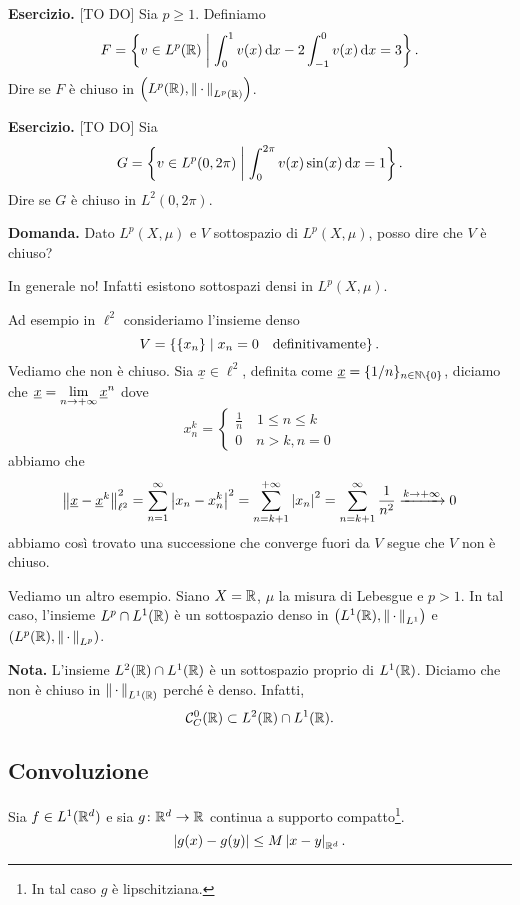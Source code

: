 \textbf{Esercizio.} [TO DO] Sia $p \geq 1$. Definiamo 
%
$$
F = \left\{ v \in L^p(\mathbb R) \;\middle|\; \int_{0}^{1} v(x) \,\mathrm{d} x - 2 \int_{-1}^{0} v(x) \,\mathrm{d} x = 3 \right\}.
$$
%
Dire se $F$ è chiuso in $\left( L^p(\mathbb R), \left\lVert \,\cdot\, \right\rVert_{L^p(\mathbb R)} \right)$.


\textbf{Esercizio.} [TO DO] Sia 
%
$$
G = \left\{ v \in L^p(0,2\pi) \;\middle|\; \int_{0}^{2\pi} v(x) \sin(x) \,\mathrm{d} x = 1  \right\}.
$$
%
Dire se $G$ è chiuso in $L^2(0,2\pi)$.

\textbf{Domanda.} Dato $L^p (X,\mu)$ e $V$ sottospazio di $L^p(X,\mu)$, posso dire che $V$ è chiuso?

In generale no! Infatti esistono sottospazi densi in $L^p(X,\mu)$.

Ad esempio in $\ell^2$ consideriamo l'insieme denso
%
$$
V = \left\{ \left\{ x_n \right\} \;\middle|\; x_n = 0 \quad \text{definitivamente}  \right\}.
$$
%
Vediamo che non è chiuso. Sia $\underline{x} \in \ell^2$, definita come $\underline{x} = \{ 1 / n \}_{n \in \N \setminus \{0 \}}$, diciamo che $\displaystyle \underline{x} = \lim_{n \to +\infty} \underline{x}^n$ dove
$$
x_n^k = 
\begin{cases}
\frac{1}{n} \quad 1 \leq n \leq k \\
0 \quad n > k, n = 0
\end{cases} 
$$
abbiamo che
$$
\left\lVert \underline{x} - \underline{x}^k \right\rVert_{\ell^2}^2 = \sum_{n=1}^{\infty} \left| x_n -x_n^k \right|^2 = \sum_{n = k+1}^{+\infty} \left| x_n \right|^2 = \sum_{n = k+1}^{\infty} \frac{1}{n^2} \xrightarrow{k \to +\infty} 0
$$
abbiamo così trovato una successione che converge fuori da $V$ segue che $V$ non è chiuso.

Vediamo un altro esempio. Siano $X = \mathbb R$, $\mu$ la misura di Lebesgue e $p > 1$.
In tal caso, l'insieme $L^p \cap L^1 (\mathbb R)$ è un sottospazio denso in $\left( L^1(\mathbb R), \left\lVert \,\cdot\,  \right\rVert_{L^1} \right)$ e $\left( L^p(\mathbb R), \left\lVert \,\cdot\,  \right\rVert_{L^p} \right)$.

\textbf{Nota.} L'insieme $L^2(\mathbb R) \cap L^1(\mathbb R)$ è un sottospazio proprio di $L^1(\mathbb R)$. Diciamo che non è chiuso in $\left\lVert \,\cdot\, \right\rVert_{L^1(\mathbb R)}$ perché è denso.
Infatti, 
%
$$
\mathcal{C}_C^0(\mathbb R) \subset L^2(\mathbb R) \cap L^1(\mathbb R).
$$
%

\subsection{Convoluzione}

Sia $f \in L^1(\mathbb R^d)$ e sia $g \colon \mathbb R^d \to \mathbb R$ continua a supporto compatto\footnote{In tal caso $g$ è lipschitziana.}.
%
$$
\left| g(x) - g(y) \right| \leq M \left| x - y \right|_{\mathbb R^d}.
$$
%

